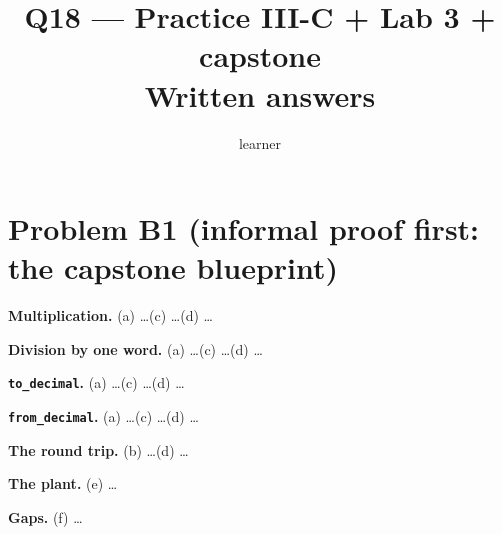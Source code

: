 \documentclass[11pt]{article}
\title{Q18 --- Practice III-C + Lab 3 + capstone \\ \large Written answers}
\author{learner}
\date{}
\begin{document}
\maketitle

\section*{Problem B1 (informal proof first: the capstone blueprint)}\label{ans:B1}
\begin{answer}

\textbf{Multiplication.}
(a) \dots \quad (c) \dots \quad (d) \dots

\textbf{Division by one word.}
(a) \dots \quad (c) \dots \quad (d) \dots

\textbf{\texttt{to\_decimal}.}
(a) \dots \quad (c) \dots \quad (d) \dots

\textbf{\texttt{from\_decimal}.}
(a) \dots \quad (c) \dots \quad (d) \dots

\textbf{The round trip.}
(b) \dots \quad (d) \dots

\textbf{The plant.}
(e) \dots

\textbf{Gaps.}
(f) \dots
\end{answer}

\end{document}
